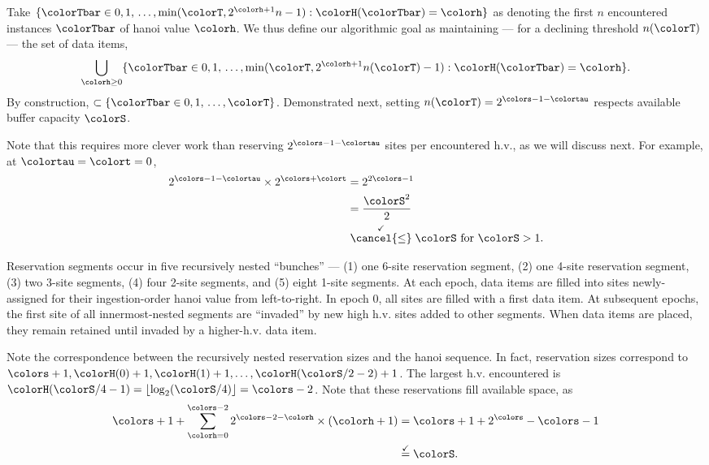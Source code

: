Take $\{ \colorTbar \in 0, 1, \, \ldots, \min(\colorT, 2^{\colorh + 1}n - 1) : \colorH(\colorTbar) = \colorh \}$ as denoting the first $n$ encountered instances $\colorTbar$ of hanoi value $\colorh$.
We thus define our algorithmic goal as maintaining --- for a declining threshold $n(\colorT)$ --- the set of data items,
\begin{align*}
\bigcup_{\colorh \geq 0}
\{ \colorTbar \in 0, 1, \, \ldots, \min(\colorT, 2^{\colorh + 1}n(\colorT) - 1) : \colorH(\colorTbar) = \colorh \}.
\end{align*}
By construction, $\subset \{ \colorTbar \in 0, 1, \, \ldots, \colorT \}$.
Demonstrated next, setting $n(\colorT) = 2^{\colors - 1 - \colortau}$ respects available buffer capacity $\colorS$.



Note that this requires more clever work than reserving $2^{\colors - 1 - \colortau}$ sites per encountered h.v., as we will discuss next.
For example, at $\colortau=\colort=0$,
\begin{align*}
2^{\colors - 1 - \colortau} \times 2^{\colors + \colort}
&=
2^{2\colors - 1}\\
&=
\frac{\colorS^{2}}{2}\\
&\stackrel{\checkmark}{\cancel{\leq}} \colorS \text{ for } \colorS > 1.
\end{align*}



Reservation segments occur in five recursively nested ``bunches'' --- (1) one 6-site reservation segment, (2) one 4-site reservation segment, (3) two 3-site segments, (4) four 2-site segments, and (5) eight 1-site segments.
At each epoch, data items are filled into sites newly-assigned for their ingestion-order hanoi value from left-to-right.
In epoch 0, all sites are filled with a first data item.
At subsequent epochs, the first site of all innermost-nested segments are ``invaded'' by new high h.v. sites added to other segments.
When data items are placed, they remain retained until invaded by a higher-h.v. data item.

Note the correspondence between the recursively nested reservation sizes and the hanoi sequence.
In fact, reservation sizes correspond to $\colors + 1, \colorH(0) + 1, \colorH(1) + 1, \ldots, \colorH(\colorS/2 - 2) + 1$.
The largest h.v. encountered is $\colorH(\colorS/4 - 1) = \left\lfloor \log_2(\colorS/4) \right\rfloor = \colors - 2$.
Note that these reservations fill available space, as
\begin{align*}
\colors + 1
+  \sum_{\colorh = 0}^{\colors - 2}
2^{\colors - 2 - \colorh} \times (\colorh + 1)
&=
\colors + 1 +
2^{\colors} - \colors - 1\\
&\stackrel{\checkmark}{=}
\colorS.
\end{align*}


